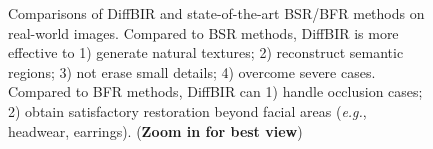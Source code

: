 \documentclass{article}
\begin{document}
\begin{figure}[t]
\centering
{}\hfill
{}\hfill
\caption{\small Comparisons of DiffBIR and state-of-the-art BSR/BFR methods on real-world images.  Compared to BSR methods, DiffBIR is more effective to 1) generate natural textures; 2) reconstruct semantic regions; 3) not erase small details; 4) overcome severe cases. Compared to BFR methods, DiffBIR can 1) handle occlusion cases; 2) obtain satisfactory restoration beyond facial areas (\textit{e.g.}, headwear, earrings). (\textbf{Zoom in for best view})} \label{fig:teaser} \vspace{-1em}
\end{figure}
\end{document}
